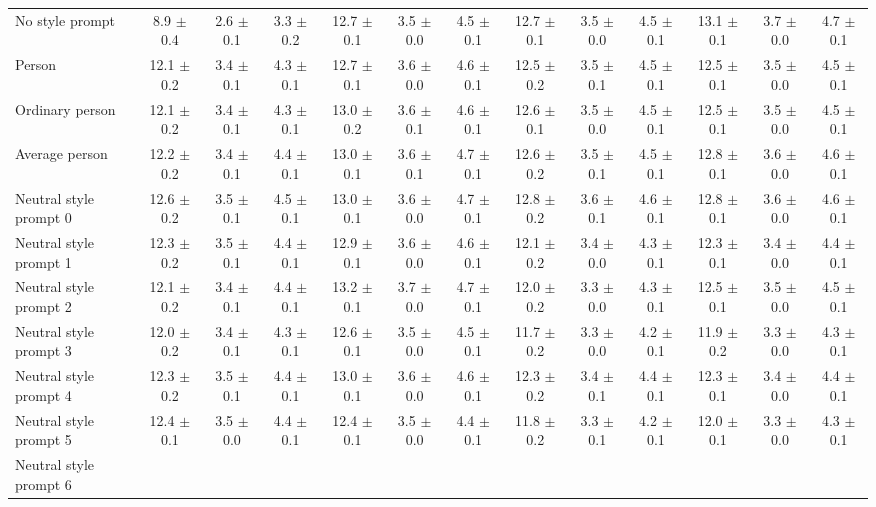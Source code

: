 \begin{table*}[p]
{\begin{tabular}{l|ccc|ccc|ccc|ccc}
No style prompt
& 8.9 $\pm$ 0.4 & 2.6 $\pm$ 0.1 & 3.3 $\pm$ 0.2 & 12.7 $\pm$ 0.1 & 3.5 $\pm$ 0.0 & 4.5 $\pm$ 0.1 & 12.7 $\pm$ 0.1 & 3.5 $\pm$ 0.0 & 4.5 $\pm$ 0.1 & 13.1 $\pm$ 0.1 & 3.7 $\pm$ 0.0 & 4.7 $\pm$ 0.1 \\
Person
& 12.1 $\pm$ 0.2 & 3.4 $\pm$ 0.1 & 4.3 $\pm$ 0.1 & 12.7 $\pm$ 0.1 & 3.6 $\pm$ 0.0 & 4.6 $\pm$ 0.1 & 12.5 $\pm$ 0.2 & 3.5 $\pm$ 0.1 & 4.5 $\pm$ 0.1 & 12.5 $\pm$ 0.1 & 3.5 $\pm$ 0.0 & 4.5 $\pm$ 0.1 \\
Ordinary person
& 12.1 $\pm$ 0.2 & 3.4 $\pm$ 0.1 & 4.3 $\pm$ 0.1 & 13.0 $\pm$ 0.2 & 3.6 $\pm$ 0.1 & 4.6 $\pm$ 0.1 & 12.6 $\pm$ 0.1 & 3.5 $\pm$ 0.0 & 4.5 $\pm$ 0.1 & 12.5 $\pm$ 0.1 & 3.5 $\pm$ 0.0 & 4.5 $\pm$ 0.1 \\
Average person
& 12.2 $\pm$ 0.2 & 3.4 $\pm$ 0.1 & 4.4 $\pm$ 0.1 & 13.0 $\pm$ 0.1 & 3.6 $\pm$ 0.1 & 4.7 $\pm$ 0.1 & 12.6 $\pm$ 0.2 & 3.5 $\pm$ 0.1 & 4.5 $\pm$ 0.1 & 12.8 $\pm$ 0.1 & 3.6 $\pm$ 0.0 & 4.6 $\pm$ 0.1 \\
Neutral style prompt 0
& 12.6 $\pm$ 0.2 & 3.5 $\pm$ 0.1 & 4.5 $\pm$ 0.1 & 13.0 $\pm$ 0.1 & 3.6 $\pm$ 0.0 & 4.7 $\pm$ 0.1 & 12.8 $\pm$ 0.2 & 3.6 $\pm$ 0.1 & 4.6 $\pm$ 0.1 & 12.8 $\pm$ 0.1 & 3.6 $\pm$ 0.0 & 4.6 $\pm$ 0.1 \\
Neutral style prompt 1
& 12.3 $\pm$ 0.2 & 3.5 $\pm$ 0.1 & 4.4 $\pm$ 0.1 & 12.9 $\pm$ 0.1 & 3.6 $\pm$ 0.0 & 4.6 $\pm$ 0.1 & 12.1 $\pm$ 0.2 & 3.4 $\pm$ 0.0 & 4.3 $\pm$ 0.1 & 12.3 $\pm$ 0.1 & 3.4 $\pm$ 0.0 & 4.4 $\pm$ 0.1 \\
Neutral style prompt 2
& 12.1 $\pm$ 0.2 & 3.4 $\pm$ 0.1 & 4.4 $\pm$ 0.1 & 13.2 $\pm$ 0.1 & 3.7 $\pm$ 0.0 & 4.7 $\pm$ 0.1 & 12.0 $\pm$ 0.2 & 3.3 $\pm$ 0.0 & 4.3 $\pm$ 0.1 & 12.5 $\pm$ 0.1 & 3.5 $\pm$ 0.0 & 4.5 $\pm$ 0.1 \\
Neutral style prompt 3
& 12.0 $\pm$ 0.2 & 3.4 $\pm$ 0.1 & 4.3 $\pm$ 0.1 & 12.6 $\pm$ 0.1 & 3.5 $\pm$ 0.0 & 4.5 $\pm$ 0.1 & 11.7 $\pm$ 0.2 & 3.3 $\pm$ 0.0 & 4.2 $\pm$ 0.1 & 11.9 $\pm$ 0.2 & 3.3 $\pm$ 0.0 & 4.3 $\pm$ 0.1 \\
Neutral style prompt 4
& 12.3 $\pm$ 0.2 & 3.5 $\pm$ 0.1 & 4.4 $\pm$ 0.1 & 13.0 $\pm$ 0.1 & 3.6 $\pm$ 0.0 & 4.6 $\pm$ 0.1 & 12.3 $\pm$ 0.2 & 3.4 $\pm$ 0.1 & 4.4 $\pm$ 0.1 & 12.3 $\pm$ 0.1 & 3.4 $\pm$ 0.0 & 4.4 $\pm$ 0.1 \\
Neutral style prompt 5
& 12.4 $\pm$ 0.1 & 3.5 $\pm$ 0.0 & 4.4 $\pm$ 0.1 & 12.4 $\pm$ 0.1 & 3.5 $\pm$ 0.0 & 4.4 $\pm$ 0.1 & 11.8 $\pm$ 0.2 & 3.3 $\pm$ 0.1 & 4.2 $\pm$ 0.1 & 12.0 $\pm$ 0.1 & 3.3 $\pm$ 0.0 & 4.3 $\pm$ 0.1 \\
Neutral style prompt 6

\end{tabular}}
\end{table*}
